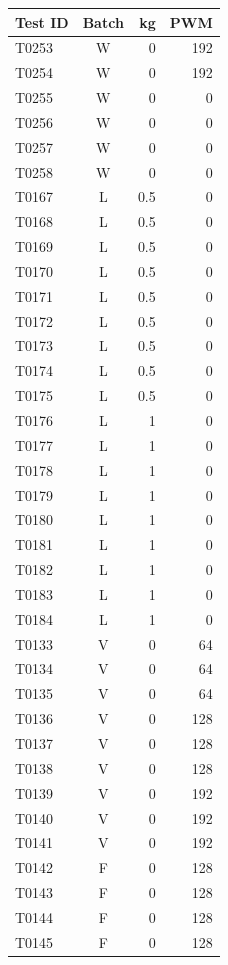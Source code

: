 \documentclass[10pt,letterpaper]{article}
\renewcommand{\arraystretch}{1.15}
\begin{document}
\noindent
\begin{minipage}[t]{0.48\textwidth}\vspace{0pt}\centering\fontsize{8.5}{9.6}\selectfont
\renewcommand{\arraystretch}{1}\begin{tabular}{lcrr}\toprule Test ID & Batch & kg & PWM\\\midrule
T0253 & W & 0 & 192\\
T0254 & W & 0 & 192\\
T0255 & W & 0 & 0\\
T0256 & W & 0 & 0\\
T0257 & W & 0 & 0\\
T0258 & W & 0 & 0\\
T0167 & L & 0.5 & 0\\
T0168 & L & 0.5 & 0\\
T0169 & L & 0.5 & 0\\
T0170 & L & 0.5 & 0\\
T0171 & L & 0.5 & 0\\
T0172 & L & 0.5 & 0\\
T0173 & L & 0.5 & 0\\
T0174 & L & 0.5 & 0\\
T0175 & L & 0.5 & 0\\
T0176 & L & 1 & 0\\
T0177 & L & 1 & 0\\
T0178 & L & 1 & 0\\
T0179 & L & 1 & 0\\
T0180 & L & 1 & 0\\
T0181 & L & 1 & 0\\
T0182 & L & 1 & 0\\
T0183 & L & 1 & 0\\
T0184 & L & 1 & 0\\
T0133 & V & 0 & 64\\
T0134 & V & 0 & 64\\
T0135 & V & 0 & 64\\
T0136 & V & 0 & 128\\
T0137 & V & 0 & 128\\
T0138 & V & 0 & 128\\
T0139 & V & 0 & 192\\
T0140 & V & 0 & 192\\
T0141 & V & 0 & 192\\
T0142 & F & 0 & 128\\
T0143 & F & 0 & 128\\
T0144 & F & 0 & 128\\
T0145 & F & 0 & 128\\

\end{tabular}
\end{minipage}
\end{document}
